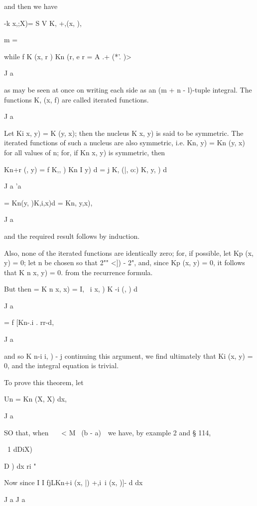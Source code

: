 {and then we have

-k x,;X)= S V K, +,(x, ),

m =

while f K (x, r ) Kn (r, e r = A .+ (*'. )>

J a

as may be seen at once on writing each side as an (m + n - l)-tuple
integral. The functions K, (x, f) are called iterated functions.

J a

%
%


Let Ki x, y) = K (y, x); then the nucleus K x, y) is said to be
symmetric. The iterated functions of such a nucleus are also
symmetric, i.e. Kn, y) = Kn (y, x) for all values of n; for, if Kn
x, y) is symmetric, then

Kn+r (, y) = f K,, ) Kn I y) d = j K, (|, o:) K, y, ) d

J a 'a

= Kn(y, )K,i,x)d = Kn, y,x),

J a

and the required result follows by induction.

Also, none of the iterated functions are identically zero; for, if
possible, let Kp (x, y) = 0; let n be chosen so that 2"" <]) - 2",
and, since Kp (x, y) = 0, it follows that K n x, y) = 0. from the
recurrence formula.

But then = K n x, x) = I, \ i x, ) K -i (, ) d

J a

= f [Kn-.i . rr-d,

J a

and so K n-i i, ) - j continuing this argument, we find ultimately
that Ki (x, y) = 0, and the integral equation is trivial.


To prove this theorem, let

Un = Kn (X, X) dx,

J a

SO that, when \ \ \ < M~ (b - a)~\ we have, by example 2 and §
114,

\ 1 dDiX)

D ) dx ri "

Now since I I fjLKn+i (x, |) +,i\ i (x, )]- d dx

J a J a

}
